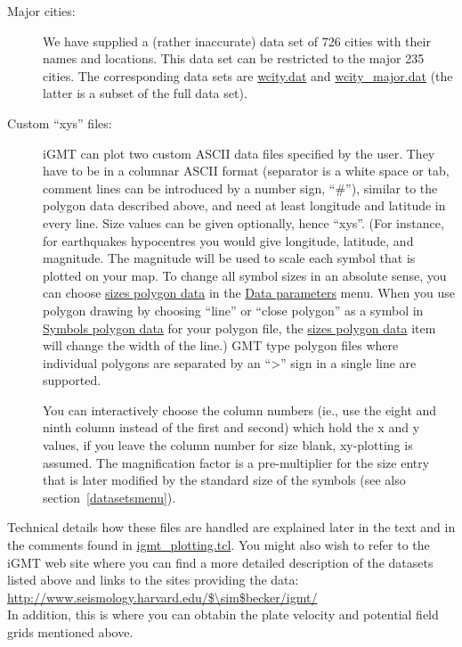 \documentclass[11pt]{article}
\begin{document}
\begin{description}
  
  
\item[Major cities:] We have supplied a (rather inaccurate) data set
  of 726 cities with their names and locations.  This data set can be
  restricted to the major 235 cities. The corresponding data sets are
  \url{wcity.dat} and \url{wcity_major.dat} (the latter is a subset
  of the full data set).
  
\item[Custom ``xys'' files:] iGMT can plot two custom ASCII data files
  specified by the user.  They have to be in a columnar ASCII format
  (separator is a white space or tab, comment lines can be introduced
  by a number sign, ``\#''), similar to the polygon data described
  above, and need at least longitude and latitude in every line. Size
  values can be given optionally, hence ``xys''.  (For instance, for
  earthquakes hypocentres you would give longitude, latitude, and
  magnitude. The magnitude will be used to scale each symbol that is
  plotted on your map. To change all symbol sizes in an absolute
  sense, you can choose \url{sizes polygon data} in the \url{Data
    parameters} menu.  When you use polygon drawing by choosing
  ``line'' or ``close polygon'' as a symbol in \url{Symbols polygon
    data} for your polygon file, the \url{sizes polygon data} item
  will change the width of the line.) GMT type polygon files where
  individual polygons are separated by an ``>'' sign in a single line
  are supported. 
  
  You can interactively choose the column numbers (ie., use the eight
  and ninth column instead of the first and second) which hold the x
  and y values, if you leave the column number for size blank,
  xy-plotting is assumed. The magnification factor is a
  pre-multiplier for the size entry that is later modified by the
  standard size of the symbols (see also section~\ref{datasetsmenu}).


\end{description}

Technical details how these files are handled are explained later in
the text and in the comments found in \url{igmt_plotting.tcl}. You
might also wish to refer to the iGMT web site where you can find a
more detailed description
of the datasets listed above and links to the sites providing the data:\\

\url{http://www.seismology.harvard.edu/$\sim$becker/igmt/}\\

In addition, this is where you can obtabin the plate velocity and
potential field grids mentioned above.
\end{document}
